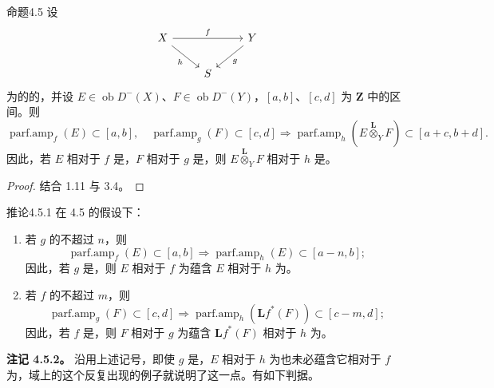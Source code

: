 \begin{SGAresult}{命题}{4.5}
设
\[
\begin{tikzcd}
X\arrow[rr,"f"]\arrow[dr,"h"']&&Y\arrow[dl,"g"]\\
&S&
\end{tikzcd}
\]
为的的，并设 $E\in\operatorname{ob}D^-(X)$、$F\in\operatorname{ob}D^-(Y)$，$[a,b]$、$[c,d]$ 为 $\mathbf Z$ 中的区间。则
\[
\operatorname{parf.amp}_f(E)\subset[a,b],\quad\operatorname{parf.amp}_g(F)\subset[c,d]
\Longrightarrow
\operatorname{parf.amp}_h(E\mathbin{\overset{\mathbf L}{\otimes}}_YF)\subset[a+c,b+d].
\]
因此，若 $E$ 相对于 $f$ 是，$F$ 相对于 $g$ 是，则 $E\mathbin{\overset{\mathbf L}{\otimes}}_YF$ 相对于 $h$ 是。
\end{SGAresult}
\begin{proof}结合 1.11 与 3.4。
\end{proof}
\begin{SGAresult}{推论}{4.5.1}
在 4.5 的假设下：
\begin{enumerate}
\item[a)] 若 $g$ 的不超过 $n$，则
\[
\operatorname{parf.amp}_f(E)\subset[a,b]\Longrightarrow\operatorname{parf.amp}_h(E)\subset[a-n,b];
\]
因此，若 $g$ 是，则 $E$ 相对于 $f$ 为蕴含 $E$ 相对于 $h$ 为。
\item[b)] 若 $f$ 的不超过 $m$，则
\[
\operatorname{parf.amp}_g(F)\subset[c,d]\Longrightarrow\operatorname{parf.amp}_h(\mathbf Lf^*(F))\subset[c-m,d];
\]
因此，若 $f$ 是，则 $F$ 相对于 $g$ 为蕴含 $\mathbf Lf^*(F)$ 相对于 $h$ 为。
\end{enumerate}
\end{SGAresult}
\textbf{注记 4.5.2。} 沿用上述记号，即使 $g$ 是，$E$ 相对于 $h$ 为也未必蕴含它相对于 $f$ 为，域上的这个反复出现的例子就说明了这一点。有如下判据。

